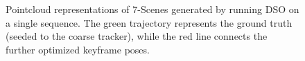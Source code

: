 \begin{figure}
	\quad
	
	\caption{Pointcloud representations of 7-Scenes generated by running DSO on a single sequence. The green trajectory represents the ground truth (seeded to the coarse tracker), while the red line connects the further optimized keyframe poses.}
	\label{fig:visualodometry_7scenes}
\end{figure}

